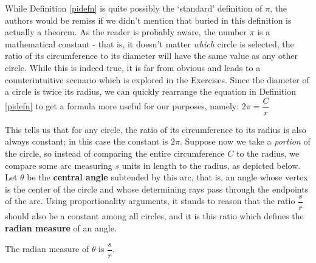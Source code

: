\documentclass[12pt]{ximera}
\begin{document}

\smallskip

While Definition \ref{pidefn} is quite possibly the `standard' definition of $\pi$, the authors would be remiss if we didn't mention that buried in this definition is actually a theorem.  As the reader is probably aware, the number $\pi$ is a mathematical constant - that is, it doesn't matter \textit{which} circle is selected, the ratio of its circumference to its diameter will have the same value as any other circle.  While this is indeed true, it is far from obvious and leads to a  counterintuitive scenario which is explored in the Exercises.   Since the diameter of a circle is twice its radius, we can quickly rearrange the equation in Definition \ref{pidefn} to get a formula more useful for our purposes, namely: $2 \pi = \dfrac{C}{r}$

This tells us that for any circle, the ratio of its circumference to its radius is also always constant; in this case the constant is $2\pi$.  Suppose now we take a \textit{portion} of the circle, so instead of comparing the entire circumference $C$ to the radius, we compare some arc measuring $s$ units in length to the radius, as depicted below.  Let $\theta$ be the \textbf{central angle} subtended by this arc, that is, an angle whose vertex is the center of the circle and whose determining rays pass through the endpoints of the arc.  Using proportionality arguments, it stands to reason that the ratio $\dfrac{s}{r}$ should also be a constant among all circles, and it is this ratio which defines the \textbf{radian measure} of an angle.

\begin{center}


 


The radian measure of $\theta$ is $\dfrac{s}{r}$. 

\end{center}
\end{document}
